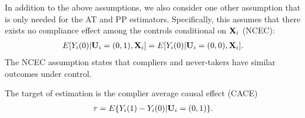 \documentclass{article}
\newtheorem{assumption}{Assumption}
\begin{document}
In addition to the above assumptions, we also consider one other assumption that is only needed for the AT and PP estimators. Specifically, this assumes that there exists no compliance effect among the controls conditional on ${\bf X}_i$ (NCEC):
\begin{align}
    E[Y_i(0) | {\bf U}_i = (0, 1), {\bf X}_i] = E[Y_i(0) | {\bf U}_i = (0, 0), {\bf X}_i]. \label{ncec}
\end{align}
The NCEC assumption states that compliers and never-takers have similar outcomes under control. 


The target of estimation is the complier average causal effect (CACE) 
\begin{align}
\tau = E\{Y_i(1) - Y_i(0) | {\bf U}_i = (0,1)\}. \label{cace}
\end{align}






\end{document}
